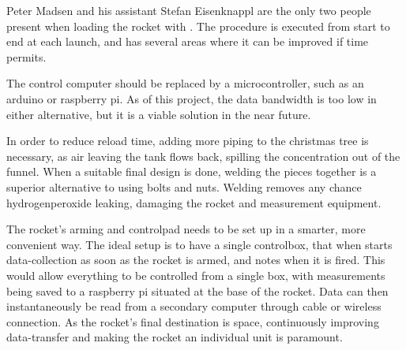 Peter Madsen and his assistant Stefan Eisenknappl are the only two people present when loading the rocket with . The procedure is executed from start to end at each launch, and has several areas where it can be improved if time permits.

The control computer should be replaced by a microcontroller, such as an arduino or raspberry pi. As of this project, the data bandwidth is too low in either alternative, but it is a viable solution in the near future.

In order to reduce reload time, adding more piping to the christmas tree is necessary, as air leaving the  tank flows back, spilling the  concentration out of the funnel. When a suitable final design is done, welding the pieces together is a superior alternative to using bolts and nuts. Welding removes any chance hydrogenperoxide leaking, damaging the rocket and measurement equipment.

The rocket's arming and controlpad needs to be set up in a smarter, more convenient way. The ideal setup is to have a single controlbox, that when starts data-collection as soon as the rocket is armed, and notes when it is fired. This would allow everything to be controlled from a single box, with measurements being saved to a raspberry pi situated at the base of the rocket. Data can then instantaneously be read from a secondary computer through cable or wireless connection. As the rocket's final destination is space, continuously improving data-transfer and making the rocket an individual unit is paramount.
